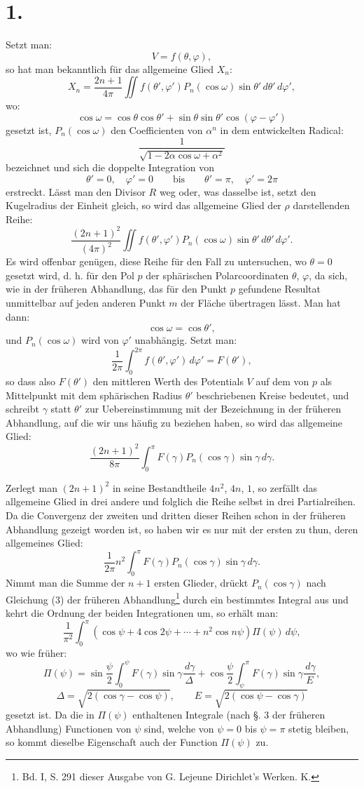 \documentclass[11pt]{article}
\newcommand{\dd}{\,d}
\begin{document}
\section*{1.}

Setzt man:
\[
 V=f(\theta,\varphi),
\]
so hat man bekanntlich für das allgemeine Glied $X_n$:
\[
 X_n=\frac{2n+1}{4\pi}\iint f(\theta',\varphi')P_n(\cos\omega)\sin\theta'\dd\theta'\dd\varphi',
\]
wo:
\[
 \cos\omega=\cos\theta\cos\theta' + \sin\theta\sin\theta'\cos(\varphi-\varphi')
\]
gesetzt ist, $P_n(\cos\omega)$ den Coefficienten von $\alpha^n$ in dem entwickelten Radical:
\[
 \frac{1}{\sqrt{1-2\alpha\cos\omega+\alpha^2}}
\]
bezeichnet und sich die doppelte Integration von
\[
 \theta'=0,\quad \varphi'=0 \qquad\text{bis}\qquad \theta'=\pi,\quad \varphi'=2\pi
\]
erstreckt. Lässt man den Divisor $R$ weg oder, was dasselbe ist, setzt den Kugelradius der Einheit gleich, so wird das allgemeine Glied der $\rho$ darstellenden Reihe:
\[
 \frac{(2n+1)^2}{(4\pi)^2}\iint f(\theta',\varphi')P_n(\cos\omega)\sin\theta'\dd\theta'\dd\varphi'.
\]
Es wird offenbar genügen, diese Reihe für den Fall zu untersuchen, wo $\theta=0$ gesetzt wird, d. h. für den Pol $p$ der sphärischen Polarcoordinaten $\theta$, $\varphi$, da sich, wie in der früheren Abhandlung, das für den Punkt $p$ gefundene Resultat unmittelbar auf jeden anderen Punkt $m$ der Fläche übertragen lässt. Man hat dann:
\[
 \cos\omega=\cos\theta',
\]
und $P_n(\cos\omega)$ wird von $\varphi'$ unabhängig. Setzt man:
\[
 \frac{1}{2\pi}\int_0^{2\pi} f(\theta',\varphi')\dd\varphi'=F(\theta'),
\]
so dass also $F(\theta')$ den mittleren Werth des Potentials $V$ auf dem von $p$ als Mittelpunkt mit dem sphärischen Radius $\theta'$ beschriebenen Kreise bedeutet, und schreibt $\gamma$ statt $\theta'$ zur Uebereinstimmung mit der Bezeichnung in der früheren Abhandlung, auf die wir uns häufig zu beziehen haben, so wird das allgemeine Glied:
\[
 \frac{(2n+1)^2}{8\pi}\int_0^\pi F(\gamma)P_n(\cos\gamma)\sin\gamma\dd\gamma.
\]

Zerlegt man $(2n+1)^2$ in seine Bestandtheile $4n^2$, $4n$, $1$, so zerfällt das allgemeine Glied in drei andere und folglich die Reihe selbst in drei Partialreihen. Da die Convergenz der zweiten und dritten dieser Reihen schon in der früheren Abhandlung gezeigt worden ist, so haben wir es nur mit der ersten zu thun, deren allgemeines Glied:
\[
 \frac{1}{2\pi}n^2\int_0^\pi F(\gamma)P_n(\cos\gamma)\sin\gamma\dd\gamma.
\]
Nimmt man die Summe der $n+1$ ersten Glieder, drückt $P_n(\cos\gamma)$ nach Gleichung (3) der früheren Abhandlung\footnote{Bd. I, S. 291 dieser Ausgabe von G. Lejeune Dirichlet's Werken. K.} durch ein bestimmtes Integral aus und kehrt die Ordnung der beiden Integrationen um, so erhält man:
\[
 \frac{1}{\pi^2}\int_0^\pi (\cos\psi+4\cos2\psi+\cdots+n^2\cos n\psi)\Pi(\psi)\dd\psi,
\]
wo wie früher:
\[
 \Pi(\psi)=\sin\frac{\psi}{2}\int_0^\psi F(\gamma)\sin\gamma\frac{\dd\gamma}{\Delta}
 +\cos\frac{\psi}{2}\int_\psi^\pi F(\gamma)\sin\gamma\frac{\dd\gamma}{E},
\]
\[
 \Delta=\sqrt{2(\cos\gamma-\cos\psi)},\qquad E=\sqrt{2(\cos\psi-\cos\gamma)}
\]
gesetzt ist. Da die in $\Pi(\psi)$ enthaltenen Integrale (nach §. 3 der früheren Abhandlung) Functionen von $\psi$ sind, welche von $\psi=0$ bis $\psi=\pi$ stetig bleiben, so kommt dieselbe Eigenschaft auch der Function $\Pi(\psi)$ zu.
\end{document}
